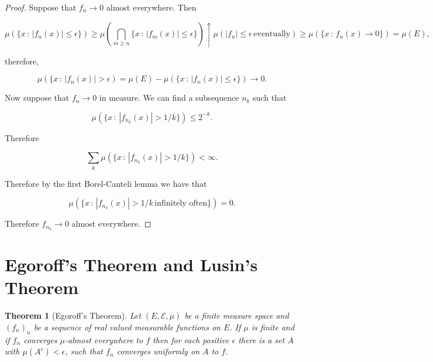 \documentclass[
]{book}
\newtheorem{theorem}{Theorem}[chapter]
\theoremstyle{definition}
\theoremstyle{definition}
\theoremstyle{definition}
\theoremstyle{definition}
\theoremstyle{remark}
\begin{document}
\begin{proof}
Suppose that \(f_n \rightarrow 0\) almost everywhere. Then

\[ \mu(\{ x\,:\, |f_n(x)| \leq \epsilon \}) \geq \mu \left( \bigcap_{m \geq n} \{ x \,:\, |f_m(x)| \leq \epsilon\}\right) \uparrow \mu \left(|f_n| \leq \epsilon \, \mbox{eventually} \right) \geq \mu(\{ x \,:\, f_n(x) \rightarrow 0\}) = \mu(E), \]

therefore,

\[ \mu(\{ x\,:\, |f_n(x)|> \epsilon) = \mu(E) - \mu(\{ x\,:\, |f_n(x)| \leq \epsilon \}) \rightarrow 0. \]

Now suppose that \(f_n \rightarrow 0\) in measure. We can find a subsequence \(n_k\) such that

\[ \mu(\{ x \,:\, |f_{n_k}(x)| > 1/k \}) \leq 2^{-k}. \]

Therefore

\[ \sum_k \mu(\{ x \,:\, |f_{n_k}(x)| > 1/k \})<\infty.\]

Therefore by the first Borel-Canteli lemma we have that

\[ \mu \left(\{ x\,:\, |f_{n_k}(x)|>1/k \, \mbox{infinitely often}\} \right) = 0. \]

Therefore \(f_{n_k} \rightarrow 0\) almost everywhere.
\end{proof}

\hypertarget{egoroffs-theorem-and-lusins-theorem}{%
\section{Egoroff's Theorem and Lusin's Theorem}\label{egoroffs-theorem-and-lusins-theorem}}

\begin{theorem}[Egoroff's Theorem]
Let \((E, \mathcal{E}, \mu)\) be a finite measure space and \((f_n)_n\) be a sequence of real valued measurable functions on \(E\). If \(\mu\) is finite and if \(f_n\) converges \(\mu\)-almost everywhere to \(f\) then for each positive \(\epsilon\) there is a set \(A\) with \(\mu(A^c)< \epsilon\), such that \(f_n\) converges uniformly on \(A\) to \(f\).
\end{theorem}
\end{document}
